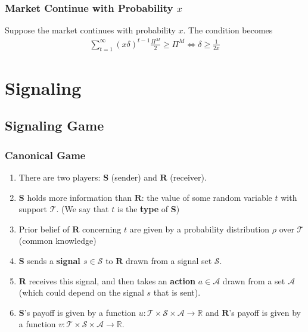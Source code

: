 \documentclass[11pt]{elegantbook_2}
\begin{document}
\subsection{Market Continue with Probability $x$}
Suppose the market continues with probability $x$. The condition becomes
\begin{equation}
    \begin{aligned}
        \sum_{t=1}^\infty (x\delta)^{t-1}\frac{\Pi^M}{2}\geq \Pi^M
        \Leftrightarrow \delta\geq \frac{1}{2x}
    \end{aligned}
    \nonumber
\end{equation}











\chapter{Signaling}
\section{Signaling Game}
\subsection{Canonical Game}
\begin{definition}
    \begin{enumerate}
        \item There are two players: $\mathbf{S}$ (sender) and $\mathbf{R}$ (receiver).
        \item $\mathbf{S}$ holds more information than $\mathbf{R}$: the value of some random variable $t$ with support $\mathcal{T}$. (We say that $t$ is the \textbf{type} of $\mathbf{S}$)
        \item Prior belief of $\mathbf{R}$ concerning $t$ are given by a probability distribution $\rho$ over $\mathcal{T}$ (common knowledge)
        \item $\mathbf{S}$ sends a \textbf{signal $s\in \mathcal{S}$} to $\mathbf{R}$ drawn from a signal set $\mathcal{S}$.
        \item $\mathbf{R}$ receives this signal, and then takes an \textbf{action} $a\in \mathcal{A}$ drawn from a set $\mathcal{A}$ (which could depend on the signal $s$ that is sent).
        \item $\mathbf{S}$'s payoff is given by a function $u: \mathcal{T}\times \mathcal{S} \times \mathcal{A} \rightarrow \mathbb{R}$ and $\mathbf{R}$'s payoff is given by a function $v: \mathcal{T}\times \mathcal{S} \times \mathcal{A} \rightarrow \mathbb{R}$.
    \end{enumerate}
\end{definition}
\end{document}
